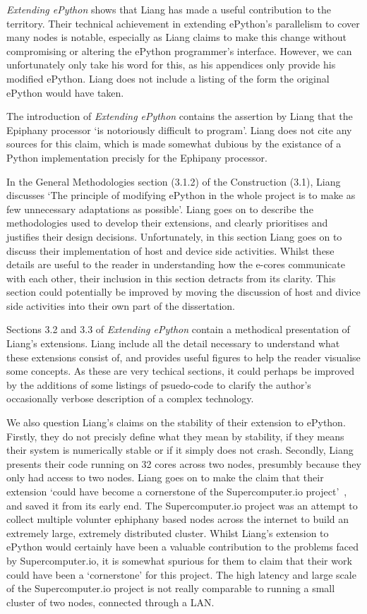 \documentclass{article}[a4]
\begin{document}
 \textit{Extending ePython} shows that Liang has made a useful contribution to the territory. Their technical achievement in extending ePython's parallelism to cover many nodes is notable, especially as Liang claims to make this change without compromising or altering the ePython programmer's interface. However, we can unfortunately only take his word for this, as his appendices only provide his modified ePython. Liang does not include a listing of the form the original ePython would have taken.

 The introduction of \textit{Extending ePython} contains the assertion by Liang that the Epiphany processor `is  notoriously  difficult  to  program'. Liang does not cite any sources for this claim, which is made somewhat dubious by the existance of a Python implementation precisly for the Ephipany processor.

 In the General Methodologies section (3.1.2) of the Construction (3.1), Liang discusses  `The principle of modifying ePython in the whole project is to make as few unnecessary adaptations as possible'. Liang goes on to describe the methodologies used to develop their extensions, and clearly prioritises and justifies their design decisions. Unfortunately, in this section Liang goes on to  discuss their implementation of host and device side activities. Whilst these details are useful to the reader in understanding how the e-cores communicate with each other, their inclusion in this section detracts from its clarity. This section could potentially be improved by moving the discussion of host and divice side activities into their own part of the dissertation.

 Sections 3.2 and 3.3 of \textit{Extending ePython} contain a methodical presentation of Liang's extensions. Liang include all the detail necessary to understand what these extensions consist of, and provides useful figures to help the reader visualise some concepts. As these are very techical sections, it could perhaps be improved by the additions of some listings of psuedo-code to clarify the author's occasionally verbose description of a complex technology.

 We also question Liang's claims on the stability of their extension to ePython. Firstly, they do not precisly define what they mean by stability, if they means their system is numerically stable or if it simply does not crash. Secondly, Liang presents their code running on 32 cores across two nodes, presumbly because they only had access to two nodes. Liang goes on to make the claim that their extension `could have become a cornerstone of the Supercomputer.io project'~\cite{Liang2017}, and saved it from its early end. The Supercomputer.io project was an attempt to collect multiple volunter ephiphany based nodes across the internet to build an extremely large, extremely distributed cluster. Whilst Liang's extension to ePython would certainly have been a valuable contribution to the problems faced by Supercomputer.io, it is somewhat spurious for them to claim that their work could have been a `cornerstone' for this project. The high latency and large scale of the Supercomputer.io project is not really comparable to running a small cluster of two nodes, connected through a LAN.
\end{document}

